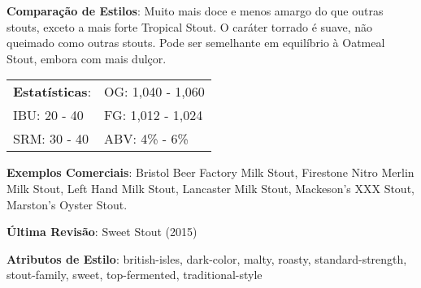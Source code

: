 \textbf{Comparação de Estilos}: Muito mais doce e menos amargo do que outras stouts, exceto a mais forte Tropical Stout. O caráter torrado é suave, não queimado como outras stouts. Pode ser semelhante em equilíbrio à Oatmeal Stout, embora com mais dulçor.

\begin{tabular}{@{}p{35mm}p{35mm}@{}}
  \textbf{Estatísticas}: & OG: 1,040 - 1,060 \\
  IBU: 20 - 40  & FG: 1,012 - 1,024 \\
  SRM: 30 - 40  & ABV: 4\% - 6\%
\end{tabular}

\textbf{Exemplos Comerciais}: Bristol Beer Factory Milk Stout, Firestone Nitro Merlin Milk Stout, Left Hand Milk Stout, Lancaster Milk Stout, Mackeson's XXX Stout, Marston’s Oyster Stout.

\textbf{Última Revisão}: Sweet Stout (2015)

\textbf{Atributos de Estilo}: british-isles, dark-color, malty, roasty, standard-strength, stout-family, sweet, top-fermented, traditional-style
